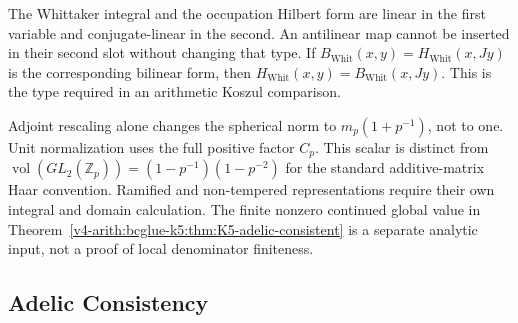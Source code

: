 \begin{remark}
\label{v4-arith:bcglue-k5:rem:K5-domain}
The Whittaker integral and the occupation Hilbert form are linear
in the first variable and conjugate-linear in the second. An
antilinear map cannot be inserted in their second slot without
changing that type. If \(B_{\mathrm{Whit}}(x,y)=H_{\mathrm{Whit}}(x,Jy)\)
is the corresponding bilinear form, then
\(H_{\mathrm{Whit}}(x,y)=B_{\mathrm{Whit}}(x,Jy)\).
This is the type required in an arithmetic Koszul comparison.

Adjoint rescaling alone changes the spherical norm to
\(m_p(1+p^{-1})\), not to one. Unit normalization uses the full
positive factor \(C_p\). This scalar is distinct from
\(\operatorname{vol}(GL_2(\mathbb Z_p))=(1-p^{-1})(1-p^{-2})\)
for the standard additive-matrix Haar convention. Ramified and
non-tempered representations require their own integral and domain
calculation. The finite nonzero continued global value in
Theorem~\ref{v4-arith:bcglue-k5:thm:K5-adelic-consistent} is a
separate analytic input, not a proof of local denominator finiteness.
\end{remark}

\subsection{Adelic Consistency}

